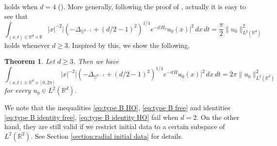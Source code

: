 \documentclass[reqno]{amsart}
\theoremstyle{plain}
\newtheorem{theorem}{Theorem}[section]
\numberwithin{equation}{section}
\theoremstyle{remark}
\newcommand{\R}{\mathbb{R}}
\renewcommand{\S}{\mathbb{S}}
\newcommand{\intervalcc}[2]{[#1, #2]}
\newcommand{\abs}[1]{\lvert#1\rvert}
\newcommand{\norm}[1]{\lVert#1\rVert}
\newcommand{\Hamiltonian}{H}
\newcommand{\Hamiltonianfree}{\Hamiltonian_0}
\newcommand{\Laplacian}{\Delta}
\newcommand{\LaplacianS}{\Laplacian_{\S^{d-1}}}
\begin{document}
holds when $d=4$ (\cite[Theorem 1.2]{BS2014}). 
More generally, following the proof of \cite[Theorem 1.2]{BS2014}, actually it is easy to see that
\begin{equation} \label{eq:type B identity free}
	\int_{(x, t) \in \R^d \times \R} \abs{x}^{-2} \abs{ (-\LaplacianS + (d/2 - 1)^2)^{1/4} e^{- i t \Hamiltonianfree} u_0(x) }^2 \, dx \, dt = \frac{\pi}{2} \norm{ u_0 }_{L^2(\R^d)}^2 
\end{equation}
holds whenever $d \geq 3$.
Inspired by this, we show the following.
\begin{theorem} \label{main thm:type B identity HO}
	Let $d \geq 3$. Then we have
		\begin{equation} \label{eq:type B identity HO}
			\int_{(x, t) \in \R^d \times \intervalcc{0}{2\pi}} \abs{x}^{-2} \abs{ (-\LaplacianS + (d/2 - 1)^2)^{1/4} e^{- i t \Hamiltonian} u_0(x) }^2 \, dx \, dt = 2\pi \norm{u_0}_{L^2(\R^d)}^2
		\end{equation}
		for every $u_0 \in L^2(\R^d)$.
\end{theorem}
We note that the inequalities \eqref{eq:type B HO}, \eqref{eq:type B free} and identities \eqref{eq:type B identity free}, \eqref{eq:type B identity HO} fail when $d=2$. 
On the other hand, they are still valid if we restrict initial data to a certain subspace of $L^2(\R^2)$. See Section \ref{section:radial initial data} for details.
\end{document}
